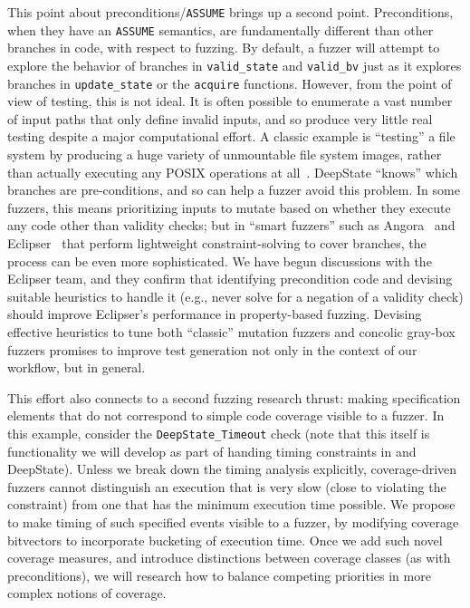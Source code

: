   This point about preconditions/{\tt ASSUME} brings up a second point.  Preconditions, when they have an {\tt ASSUME} semantics, are fundamentally different than other branches in code, with respect to fuzzing.  By default, a fuzzer will attempt to explore the behavior of branches in {\tt valid\_state} and {\tt valid\_bv} just as it explores branches in {\tt update\_state} or the {\tt acquire} functions.  However, from the point of view of testing, this is not ideal.  It is often possible to enumerate a vast number of input paths that only define invalid inputs, and so produce very little real testing despite a major computational effort.  A classic example is ``testing'' a file system by producing a huge variety of unmountable file system images, rather than actually executing any POSIX operations at all~\cite{CFV08,AMAI}.  DeepState ``knows'' which branches are pre-conditions, and so can help a fuzzer avoid this problem.  In some fuzzers, this means prioritizing inputs to mutate based on whether they execute any code other than validity checks; but in ``smart fuzzers'' such as Angora~\cite{angora} and Eclipser~\cite{eclipser} that perform lightweight constraint-solving to cover branches, the process can be even more sophisticated.  We have begun discussions with the Eclipser team, and they confirm that identifying precondition code and devising suitable heuristics to handle it (e.g., never solve for a negation of a validity check) should improve Eclipser's performance in property-based fuzzing.  Devising effective heuristics to tune both ``classic'' mutation fuzzers and concolic gray-box fuzzers promises to improve test generation not only in the context of our workflow, but in general.

This effort also connects to a second fuzzing research thrust: making specification elements that do not correspond to simple code coverage visible to a fuzzer.  In this example, consider the {\tt DeepState\_Timeout} check (note that this itself is functionality we will develop as part of handing timing constraints in \framac and DeepState).  Unless we break down the timing analysis explicitly, coverage-driven fuzzers cannot distinguish an execution that is very slow (close to violating the constraint) from one that has the minimum execution time possible.  We propose to make timing of such specified events visible to a fuzzer, by modifying coverage bitvectors to incorporate bucketing of execution time.  Once we add such novel coverage measures, and introduce distinctions between coverage classes (as with preconditions), we will research how to balance competing priorities in more complex notions of coverage.

